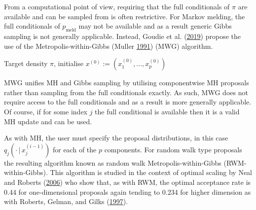 \documentclass[11pt,]{book}
\begin{document}
From a computational point of view, requiring that the full conditionals
of \(\pi\) are available and can be sampled from is often restrictive.
For Markov melding, the full conditionals of \(p_\text{meld}\) may not
be available and as a result generic Gibbs sampling is not generally
applicable. Instead, Goudie et al.
(\protect\hyperlink{ref-goudie2019joining}{2019}) propose the use of the
Metropolis-within-Gibbs (Muller
\protect\hyperlink{ref-muller1991generic}{1991}) (MWG) algorithm.

\begin{center}
\begin{tcolorbox}[title= Algorithm~\ref*{alg:mwg}: (Random-scan) Metropolis-within-Gibbs sampler, colback=white, width=0.95\linewidth, sharp corners]
\begin{algorithm}[H]
Target density $\pi$, initialise $x^{(0)} :=(x_{1}^{(0)}, \ldots, x_{p}^{(0)})$\;
\caption{}
\label{alg:mwg}
\end{algorithm}
\end{tcolorbox}
\end{center}

MWG unifies MH and Gibbs sampling by utilising componentwise MH
proposals rather than sampling from the full conditionals exactly. As
such, MWG does not require access to the full conditionals and as a
result is more generally applicable. Of course, if for some index \(j\)
the full conditional is available then it is a valid MH update and can
be used.

As with MH, the user must specify the proposal distributions, in this
case \(q_j(\cdot \, | \, x_j^{(i-1)})\) for each of the \(p\)
components. For random walk type proposals the resulting algorithm known
as random walk Metropolis-within-Gibbs (RWM-within-Gibbs). This
algorithm is studied in the context of optimal scaling by Neal and
Roberts (\protect\hyperlink{ref-neal2006optimal}{2006}) who show that,
as with RWM, the optimal acceptance rate is 0.44 for one-dimensional
proposals again tending to 0.234 for higher dimension as with Roberts,
Gelman, and Gilks (\protect\hyperlink{ref-roberts1997weak}{1997}).
\end{document}
